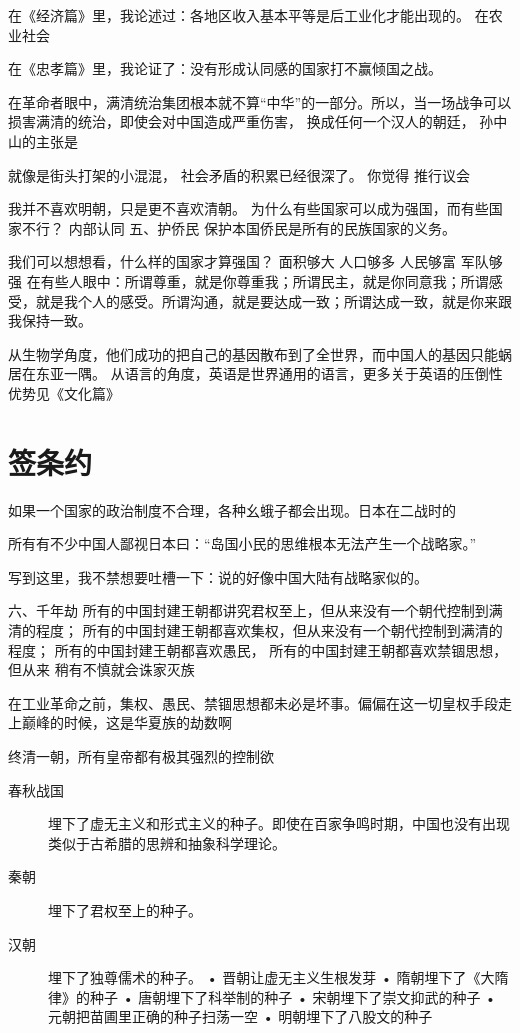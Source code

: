 在《经济篇》里，我论述过：各地区收入基本平等是后工业化才能出现的。
在农业社会

在《忠孝篇》里，我论证了：没有形成认同感的国家打不赢倾国之战。


在革命者眼中，满清统治集团根本就不算“中华”的一部分。所以，当一场战争可以损害满清的统治，即使会对中国造成严重伤害，
换成任何一个汉人的朝廷，
孙中山的主张是


就像是街头打架的小混混，
社会矛盾的积累已经很深了。
你觉得
推行议会

我并不喜欢明朝，只是更不喜欢清朝。
为什么有些国家可以成为强国，而有些国家不行？
内部认同
五、护侨民
保护本国侨民是所有的民族国家的义务。

我们可以想想看，什么样的国家才算强国？
面积够大
人口够多
人民够富
军队够强
在有些人眼中：所谓尊重，就是你尊重我；所谓民主，就是你同意我；所谓感受，就是我个人的感受。所谓沟通，就是要达成一致；所谓达成一致，就是你来跟我保持一致。

从生物学角度，他们成功的把自己的基因散布到了全世界，而中国人的基因只能蜗居在东亚一隅。
从语言的角度，英语是世界通用的语言，更多关于英语的压倒性优势见《文化篇》

\section{签条约}

如果一个国家的政治制度不合理，各种幺蛾子都会出现。日本在二战时的

所有有不少中国人鄙视日本曰：“岛国小民的思维根本无法产生一个战略家。”

写到这里，我不禁想要吐槽一下：说的好像中国大陆有战略家似的。

六、千年劫
所有的中国封建王朝都讲究君权至上，但从来没有一个朝代控制到满清的程度；
所有的中国封建王朝都喜欢集权，但从来没有一个朝代控制到满清的程度；
所有的中国封建王朝都喜欢愚民，
所有的中国封建王朝都喜欢禁锢思想，但从来
稍有不慎就会诛家灭族

在工业革命之前，集权、愚民、禁锢思想都未必是坏事。偏偏在这一切皇权手段走上巅峰的时候，这是华夏族的劫数啊


终清一朝，所有皇帝都有极其强烈的控制欲

\begin{description}
\item[春秋战国] 埋下了虚无主义和形式主义的种子。即使在百家争鸣时期，中国也没有出现类似于古希腊的思辨和抽象科学理论。
\item[秦朝] 埋下了君权至上的种子。
\item[汉朝] 埋下了独尊儒术的种子。
•	晋朝让虚无主义生根发芽
•	隋朝埋下了《大隋律》的种子
•	唐朝埋下了科举制的种子
•	宋朝埋下了崇文抑武的种子
•	元朝把苗圃里正确的种子扫荡一空
•	明朝埋下了八股文的种子
\end{description}


